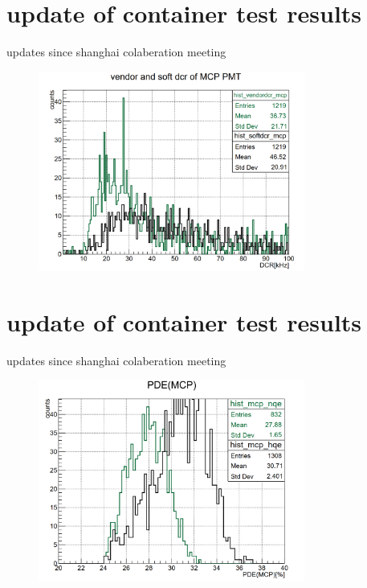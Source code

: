 \section{update of container test results}
\begin{frame}{updates since shanghai colaberation meeting}
\begin{figure}
\centering
\includegraphics[width=0.78\textwidth]{figures/zr02.png} %
\end{figure}
\end{frame}
\section{update of container test results}
\begin{frame}{updates since shanghai colaberation meeting}
\begin{figure}
\centering
\includegraphics[width=0.78\textwidth]{figures/zr03.png} %
\end{figure}
\end{frame}
